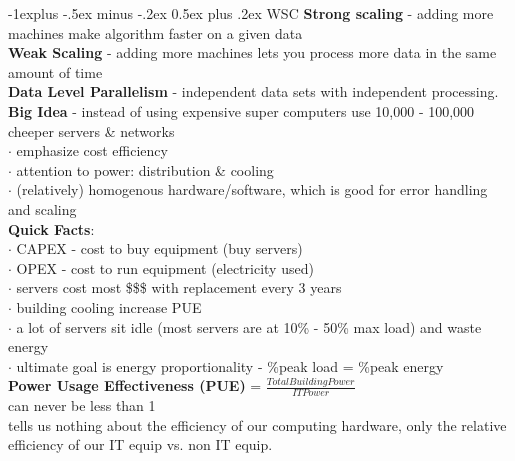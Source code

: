 \documentclass[10pt,landscape]{article}
\makeatletter
\renewcommand{\subsection}{\@startsection{subsection}{2}{0mm}%
                                {-1explus -.5ex minus -.2ex}%
                                {0.5ex plus .2ex}%
                                {\normalfont\normalsize\bfseries}}
\makeatother
\begin{document}
\raggedright
\footnotesize
\begin{multicols}{3}


\setlength{\premulticols}{1pt}
\setlength{\postmulticols}{1pt}
\setlength{\multicolsep}{1pt}
\setlength{\columnsep}{2pt}


\subsection{WSC}
{\bf Strong scaling} - adding more machines make algorithm faster on a given data\\
{\bf Weak Scaling} - adding more machines lets you process more data in the same amount of time \\
{\bf Data Level Parallelism} - independent	data	sets	with independent processing.\\
{\bf Big Idea} - instead of using expensive super computers use 10,000 - 100,000 cheeper servers \& networks \\
\hspace{5pt} $\cdot$ emphasize cost efficiency\\ 
\hspace{5pt} $\cdot$ attention to power: distribution \& cooling\\
\hspace{5pt} $\cdot$ (relatively) homogenous hardware/software, which is good for error handling and scaling\\ 
{\bf Quick Facts}: \\
$\cdot$ CAPEX - cost to buy equipment (buy servers)\\
$\cdot$ OPEX - cost to run equipment (electricity used)\\
$\cdot$ servers cost most \$\$\$ with replacement every 3 years\\
$\cdot$ building cooling increase PUE \\ 
$\cdot$ a lot of servers sit idle (most servers are at 10\% - 50\% max load) and waste energy \\
$\cdot$ ultimate goal is energy proportionality - \%peak load = \%peak energy\\
{\bf Power Usage Effectiveness (PUE)} = $\frac{Total Building Power}{IT Power}$\\ can never be less than 1 \\ tells us nothing about the efficiency of our computing hardware, only the relative efficiency of our IT equip vs. non IT equip.\\


\end{multicols}
\end{document}
